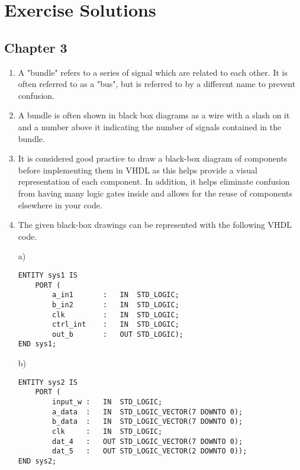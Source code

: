 \chapter{Exercise Solutions}
\stoptocwriting

\setcounter{section}{3}
\section*{Chapter 3}
\begin{enumerate}
	\item A "bundle" refers to a series of signal which are related to each other. It is often referred to as a "bus", but is referred to by a different name to prevent confusion.
	
	\item A bundle is often shown in black box diagrams as a wire with a slash on it and a number above it indicating the number of signals contained in the bundle.
	
	\item It is considered good practice to draw a black-box diagram of components before implementing them in VHDL as this helps provide a visual representation of each component. In addition, it helps eliminate confusion from having many logic gates inside and allows for the reuse of components elsewhere in your code.
	
	\item The given black-box drawings can be represented with the following VHDL code.
	
	\noindent
	\begin{minipage}{1\linewidth}
		a)
		\begin{lstlisting}[]		
ENTITY sys1 IS
	PORT (
		a_in1		:	IN	STD_LOGIC;
		b_in2		:	IN	STD_LOGIC;
		clk			:	IN	STD_LOGIC;
		ctrl_int	:	IN	STD_LOGIC;
		out_b		:	OUT STD_LOGIC);
END sys1;
		\end{lstlisting}
	\end{minipage}

	\begin{minipage}{1\linewidth}
		b)
		\begin{lstlisting}[]
ENTITY sys2 IS
	PORT (
		input_w	:	IN	STD_LOGIC;
		a_data	:	IN	STD_LOGIC_VECTOR(7 DOWNTO 0);
		b_data	:	IN	STD_LOGIC_VECTOR(7 DOWNTO 0);
		clk		:	IN	STD_LOGIC;
		dat_4	:	OUT	STD_LOGIC_VECTOR(7 DOWNTO 0);
		dat_5	:	OUT	STD_LOGIC_VECTOR(2 DOWNTO 0));
END sys2;
		\end{lstlisting}
	\end{minipage}


\end{enumerate}

